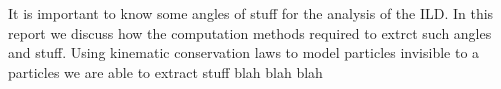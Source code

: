 It is important to know some angles of stuff for the analysis of the ILD. In this report we discuss how the computation methods required to extrct such angles and stuff. Using kinematic conservation laws to model particles invisible to a particles we are able to extract stuff blah blah blah 
